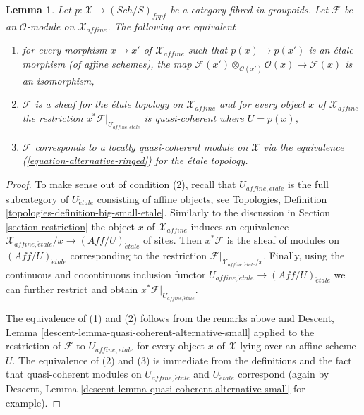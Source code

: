 \documentclass{stacks-project}
\theoremstyle{plain}
\newtheorem{lemma}[subsection]{Lemma}
\theoremstyle{definition}
\theoremstyle{remark}
\numberwithin{equation}{subsection}
\def\Sch{\mathit{Sch}}
\def\etale{{\acute{e}tale}}
\begin{document}
\begin{lemma}
\label{lemma-locally-quasi-coherent-alternative}
Let $p : \mathcal{X} \to (\Sch/S)_{fppf}$ be a category fibred in groupoids.
Let $\mathcal{F}$ be an $\mathcal{O}$-module on $\mathcal{X}_{affine}$.
The following are equivalent
\begin{enumerate}
\item for every morphism $x \to x'$ of $\mathcal{X}_{affine}$ such that
$p(x) \to p(x')$ is an \'etale morphism (of affine schemes), the map
$\mathcal{F}(x') \otimes_{\mathcal{O}(x')} \mathcal{O}(x) \to \mathcal{F}(x)$
is an isomorphism,
\item $\mathcal{F}$ is a sheaf for the \'etale topology on
$\mathcal{X}_{affine}$ and for every object $x$ of $\mathcal{X}_{affine}$
the restriction $x^*\mathcal{F}|_{U_{affine, \etale}}$ is quasi-coherent
where $U = p(x)$,
\item $\mathcal{F}$ corresponds to a locally quasi-coherent module
on $\mathcal{X}$ via the equivalence (\ref{equation-alternative-ringed})
for the \'etale topology.
\end{enumerate}
\end{lemma}

\begin{proof}
To make sense out of condition (2), recall that $U_{affine, \etale}$
is the full subcategory of $U_\etale$ consisting of affine objects, see
Topologies, Definition \ref{topologies-definition-big-small-etale}.
Similarly to the discussion in Section \ref{section-restriction}
the object $x$ of $\mathcal{X}_{affine}$ induces an equivalence
$\mathcal{X}_{affine, \etale}/x \to (\textit{Aff}/U)_\etale$ of sites.
Then $x^*\mathcal{F}$ is the sheaf of modules on $(\textit{Aff}/U)_\etale$
corresponding to the restriction
$\mathcal{F}|_{\mathcal{X}_{affine, \etale}/x}$.
Finally, using the continuous and cocontinuous inclusion functor
$U_{affine, \etale} \to (\textit{Aff}/U)_\etale$ we can further
restrict and obtain $x^*\mathcal{F}|_{U_{affine, \etale}}$.

\medskip\noindent
The equivalence of (1) and (2) follows from the remarks above and
Descent, Lemma \ref{descent-lemma-quasi-coherent-alternative-small}
applied to the restriction of $\mathcal{F}$ to $U_{affine, \etale}$
for every object $x$ of $\mathcal{X}$ lying over an affine scheme $U$.
The equivalence of (2) and (3) is immediate from the definitions
and the fact that quasi-coherent modules on $U_{affine, \etale}$
and $U_\etale$ correspond (again by
Descent, Lemma \ref{descent-lemma-quasi-coherent-alternative-small}
for example).
\end{proof}
\end{document}
